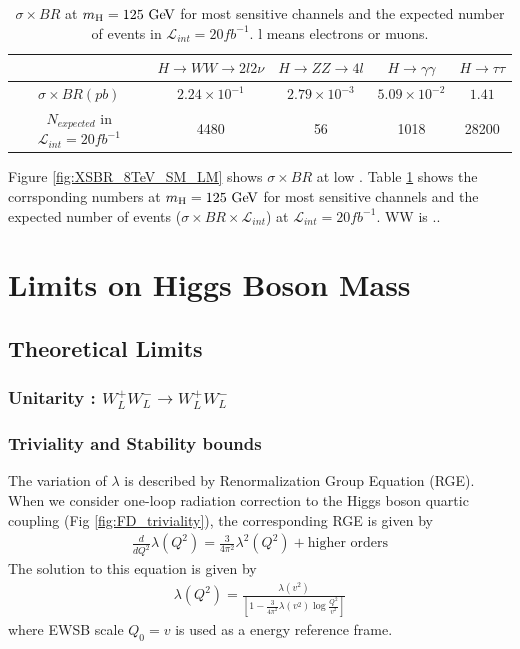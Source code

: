 \begin{table}[htb]
\centering
\begin{tabular}{c c c c c}
\hline 
        & $H \rightarrow WW \rightarrow 2l2\nu$   & $H \rightarrow ZZ\rightarrow 4l$ 
        & $H \rightarrow\gamma\gamma$ & $H \rightarrow\tau\tau$\\ 
\hline \hline 
$\sigma \times BR (pb)$  
        & $2.24\times10^{-1}$ &  $2.79\times10^{-3}$ & $5.09\times10^{-2}$ & $1.41$ \\ 
$N_{expected}$ in $\mathcal{L}_{int} = 20 fb^{-1}$ 
        & 4480 &  56 & 1018 & 28200 \\ 
\hline 
\end{tabular}
\label{tab:XSBR_8TeV_SM_125}
\caption{$\sigma \times BR$ at $m_{\mathrm{H}}=125~\mathrm{Ge\kern -0.1em V}$ for most sensitive channels 
and the expected number of events in $\mathcal{L}_{int} = 20 fb^{-1}$.
l means electrons or muons.}
\end{table}
Figure \ref{fig:XSBR_8TeV_SM_LM} shows $\sigma \times BR$ at low \mHi.
Table \ref{tab:XSBR_8TeV_SM_125} shows the corrsponding numbers at $m_{\mathrm{H}}=125~\mathrm{Ge\kern -0.1em V}$
for most sensitive channels and the expected number of events 
($\sigma \times BR \times \mathcal{L}_{int}$) at $\mathcal{L}_{int} = 20 fb^{-1}$.
WW is .. 


\section{Limits on Higgs Boson Mass} 

\subsection{Theoretical Limits} 

\subsubsection{Unitarity : $W_L^+W_L^- \rightarrow W_L^+W_L^-$}

\subsubsection{Triviality and Stability bounds}
The variation of $\lambda$ is described by Renormalization Group Equation (RGE).
When we consider one-loop radiation correction to the Higgs boson quartic coupling
(Fig \ref{fig:FD_triviality}), the corresponding RGE is given by \cite{Djouadi20081} 
\begin{eqnarray}
\frac{d}{dQ^2} \lambda (Q^2) = \frac{3}{4\pi^2} \lambda^2(Q^2) 
+ \textrm{higher orders}
\end{eqnarray} 
The solution to this equation is given by 
\begin{eqnarray} 
\displaystyle  
\lambda(Q^2) 
= \frac{\lambda(v^2)}
       {\left[ 1 - \frac{3}{4\pi^2} \lambda(v^2) \log{\frac{Q^2}{v^2}}\right] } 
\end{eqnarray} 
where EWSB scale $Q_0 = v$ is used as a energy reference frame. 



